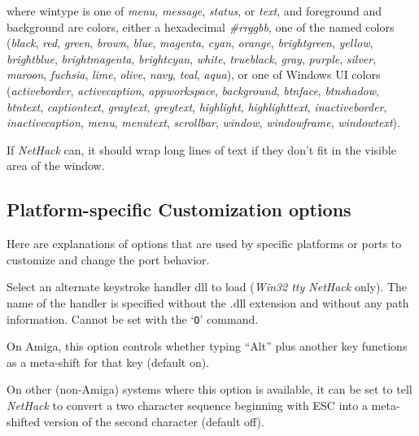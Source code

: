where wintype is one of {\it menu}, {\it message}, {\it status}, or {\it text}, and
foreground and background are colors, either a hexadecimal {\it \#rrggbb},
one of the named colors ({\it black}, {\it red}, {\it green}, {\it brown},
{\it blue}, {\it magenta}, {\it cyan}, {\it orange},
{\it brightgreen}, {\it yellow}, {\it brightblue}, {\it brightmagenta},
{\it brightcyan}, {\it white}, {\it trueblack}, {\it gray}, {\it purple},
{\it silver}, {\it maroon}, {\it fuchsia}, {\it lime}, {\it olive},
{\it navy}, {\it teal}, {\it aqua}), or one of Windows UI colors ({\it activeborder},
{\it activecaption}, {\it appworkspace}, {\it background}, {\it btnface}, {\it btnshadow},
{\it btntext}, {\it captiontext}, {\it graytext}, {\it greytext}, {\it highlight},
{\it highlighttext}, {\it inactiveborder}, {\it inactivecaption}, {\it menu},
{\it menutext}, {\it scrollbar}, {\it window}, {\it windowframe}, {\it windowtext}).

\item[\ib{wraptext}]
If {\it NetHack\/} can, it should wrap long lines of text if they don't fit
in the visible area of the window.
\elist

\subsection*{Platform-specific Customization options}

Here are explanations of options that are used by specific platforms
or ports to customize and change the port behavior.

\blist{}
\item[\ib{altkeyhandler}]
Select an alternate keystroke handler dll to load ({\it Win32 tty\/ NetHack\/} only).
The name of the handler is specified without the .dll extension and without any
path information.
Cannot be set with the `{\tt O}' command.
\item[\ib{altmeta}]
On Amiga, this option controls whether typing ``Alt'' plus another key
functions as a meta-shift for that key (default on).
\item[\ib{altmeta}]
On other (non-Amiga) systems where this option is available, it can be
set to tell {\it NetHack\/} to convert a two character sequence beginning with
ESC into a meta-shifted version of the second character (default off).

